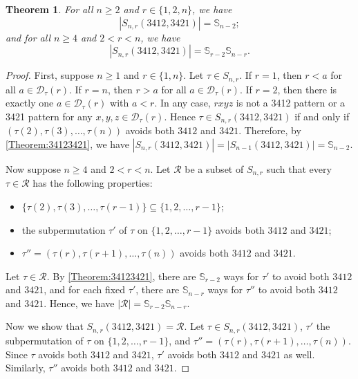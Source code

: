 \documentclass[11pt]{article}
\newtheorem{theorem}{Theorem}[section]
\theoremstyle{definition}
\numberwithin{equation}{section}
\begin{document}
\begin{theorem}\label{Theorem:34123421leading}
For all $n\geq2$ and $r\in\{1,2,n\}$, we have
\begin{equation*}
    |S_{n,r}(3412,3421)|=\mathbb{S}_{n-2};
\end{equation*}
and for all $n\geq4$ and $2<r<n$, we have
\begin{equation*}
    |S_{n,r}(3412,3421)|=\mathbb{S}_{r-2}\mathbb{S}_{n-r}.
\end{equation*}    
\end{theorem}
\begin{proof}
    First, suppose $n\geq 1$ and $r\in\{1,n\}$. Let $\tau\in S_{n,r}$. If $r=1$, then $r<a$ for all $a\in\mathcal{D}_\tau(r)$. If $r=n$, then $r>a$ for all $a\in\mathcal{D}_\tau(r)$. If $r=2$, then there is exactly one $a\in \mathcal{D}_\tau(r)$ with $a<r$. In any case, $rxyz$ is not a 3412 pattern or a 3421 pattern for any $x,y,z\in\mathcal{D}_\tau(r)$. Hence $\tau\in S_{n,r}(3412,3421)$ if and only if $(\tau(2),\tau(3),\ldots,\tau(n))$ avoids both $3412$ and $3421$. Therefore, by \cref{Theorem:34123421}, we have $|S_{n,r}(3412,3421)|=|S_{n-1}(3412,3421)|=\mathbb{S}_{n-2}$.

    Now suppose $n\geq4$ and $2<r<n$. Let $\mathcal{R}$ be a subset of $S_{n,r}$ such that every $\tau\in\mathcal{R}$ has the following properties:
    \begin{itemize}
        \item[(i)] $\{\tau(2),\tau(3),\ldots,\tau(r-1)\}\subseteq\{1,2,\ldots,r-1\}$;
        \item[(ii)] the subpermutation $\tau'$ of $\tau$ on $\{1,2,\ldots,r-1\}$ avoids both $3412$ and $3421$;
        \item[(iii)] $\tau''=(\tau(r),\tau(r+1),\ldots,\tau(n))$ avoids both $3412$ and $3421$.
    \end{itemize}
Let $\tau\in \mathcal{R}$. By \cref{Theorem:34123421}, there are $\mathbb{S}_{r-2}$ ways for $\tau'$ to avoid both $3412$ and $3421$, and for each fixed $\tau'$, there are $\mathbb{S}_{n-r}$ ways for $\tau''$ to avoid both $3412$ and $3421$. Hence, we have $|\mathcal{R}|=\mathbb{S}_{r-2}\mathbb{S}_{n-r}$.

    Now we show that $S_{n,r}(3412,3421)=\mathcal{R}$. Let $\tau\in S_{n,r}(3412,3421)$, $\tau'$ the subpermutation of $\tau$ on $\{1,2,\ldots,r-1\}$, and $\tau''=(\tau(r),\tau(r+1),\ldots,\tau(n))$. Since $\tau$ avoids both $3412$ and $3421$, $\tau'$ 
avoids both $3412$ and $3421$ as well. Similarly, $\tau''$ avoids both $3412$ and $3421$.


\end{proof}
\end{document}
